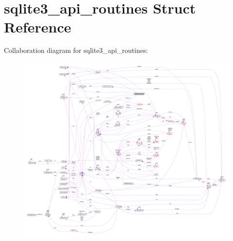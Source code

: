 \hypertarget{structsqlite3__api__routines}{\section{sqlite3\-\_\-api\-\_\-routines Struct Reference}
\label{structsqlite3__api__routines}
}


Collaboration diagram for sqlite3\-\_\-api\-\_\-routines\-:\nopagebreak
\begin{figure}[H]
\begin{center}
\leavevmode
\includegraphics[width=350pt]{structsqlite3__api__routines__coll__graph}
\end{center}
\end{figure}
